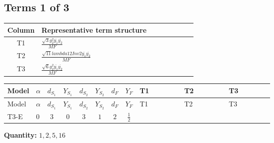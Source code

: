 \documentclass[8pt]{article}
\begin{document}
\begin{landscape}
\subsection*{Terms 1 of 3}
\begin{center}
\begin{tabular}{@{}c >{\raggedright\arraybackslash}p{0.82\linewidth}@{}}
\toprule
Column & Representative term structure \\
\midrule
T1 & \(\displaystyle \frac{\sqrt{3} g_{2}^{2} \overline{y_{1}} \overline{y_{2}}}{MF}\) \\
\midrule
T2 & \(\displaystyle \frac{\sqrt{11} lambda12Inv2 \overline{y_{1}} \overline{y_{2}}}{MF}\) \\
\midrule
T3 & \(\displaystyle \frac{\sqrt{6} g_{2}^{2} \overline{y_{1}} \overline{y_{2}}}{MF}\) \\
\midrule
\bottomrule
\end{tabular}
\end{center}
\smallskip
\tiny
\begin{longtable}{@{}llcccccc >{\raggedright\arraybackslash}p{0.21\linewidth} >{\raggedright\arraybackslash}p{0.21\linewidth} >{\raggedright\arraybackslash}p{0.21\linewidth}@{}}
\toprule
Model & $\alpha$ & $d_{S_1}$ & $Y_{S_1}$ & $d_{S_2}$ & $Y_{S_2}$ & $d_F$ & $Y_F$ & T1 & T2 & T3 \\
\midrule
\endfirsthead
\toprule
Model & $\alpha$ & $d_{S_1}$ & $Y_{S_1}$ & $d_{S_2}$ & $Y_{S_2}$ & $d_F$ & $Y_F$ & T1 & T2 & T3 \\
\midrule
\endhead
T3-E & $0$ & $3$ & $0$ & $3$ & $1$ & $2$ & $\frac{1}{2}$ & \scriptsize\adjustbox{max width=\linewidth}{$\begin{gathered} - \frac{15 \sqrt{3} g_{2}^{2} \overline{y_{1}} \overline{y_{2}}}{8 MF}\end{gathered}$} & \scriptsize\adjustbox{max width=\linewidth}{$\begin{gathered} - \frac{3 \sqrt{11} lambda12Inv2 \overline{y_{1}} \overline{y_{2}}}{22 MF}\end{gathered}$} & \scriptsize\adjustbox{max width=\linewidth}{$\begin{gathered} - \frac{\sqrt{6} g_{2}^{2} \overline{y_{1}} \overline{y_{2}}}{6 MF}\end{gathered}$} \\
\midrule
\bottomrule
\end{longtable}
\clearpage
\noindent\textbf{Quantity: }$\mathrm{1,2,5,16}$\par\smallskip

\end{landscape}
\end{document}
